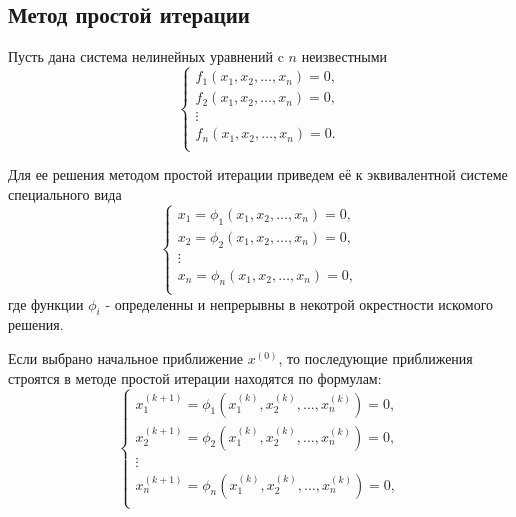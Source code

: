 \documentclass[a4paper,12pt]{article}
\begin{document}
\subsection{Метод простой итерации}
Пусть дана система нелинейных уравнений c $n$ неизвестными
$$
\left\{
    \begin{array}{l}
        f_1(x_1, x_2, \ldots, x_n) = 0, \\
        f_2(x_1, x_2, \ldots, x_n) = 0, \\
        \vdots \\
        f_n(x_1, x_2, \ldots, x_n) = 0. \\
    \end{array}
    \right.
$$

Для ее решения методом простой итерации приведем
её к эквивалентной системе специального вида
$$
\left\{
    \begin{array}{l}
        x_1 = \phi_1(x_1, x_2, \ldots, x_n) = 0, \\
        x_2 = \phi_2(x_1, x_2, \ldots, x_n) = 0, \\
        \vdots \\
        x_n = \phi_n(x_1, x_2, \ldots, x_n) = 0, \\
    \end{array}
    \right.
$$
где функции $\phi_i$ - определенны и непрерывны в некотрой окрестности
искомого решения.


Если выбрано начальное приближение $x^{(0)}$, то последующие приближения
строятся в методе простой итерации находятся по формулам:
$$
\left\{
    \begin{array}{l}
        x_1^{(k +1)} = \phi_1(x_1^{(k)}, x_2^{(k)}, \ldots, x_n^{(k)}) = 0, \\
        x_2^{(k +1)} = \phi_2(x_1^{(k)}, x_2^{(k)}, \ldots, x_n^{(k)}) = 0, \\
        \vdots \\
        x_n^{(k +1)} = \phi_n(x_1^{(k)}, x_2^{(k)}, \ldots, x_n^{(k)}) = 0, \\
    \end{array}
    \right.
$$
\end{document}
